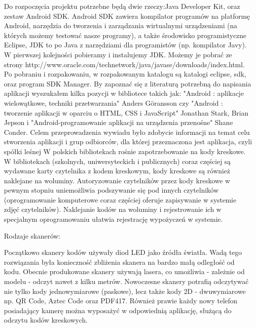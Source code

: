 



Do rozpoczęcia projektu potrzebne będą dwie rzeczy:Java Developer Kit, oraz zestaw Android SDK.  Android SDK zawiera kompilator programów na platformę Android, narzędzia do tworzenia i zarządzania wirtualnymi urządzeniami (na których możemy testować nasze programy), a także środowisko programistyczne Eclipse, JDK to po  Java z narzędziami dla programistów (np. kompilator Javy). W pierwszej kolejności pobieramy i instalujemy JDK. Możemy je pobrać ze strony http://www.oracle.com/technetwork/java/javase/downloads/index.html. Po pobraniu i rozpakowaniu, w rozpakowanym katalogu są katalogi eclipse, sdk, oraz program SDK Manager. 
By zapoznać się z literaturą potrzebną do napisania aplikacji wyszukałem kilka pozycji w bibliotece takich jak:  "Android : aplikacje wielowątkowe, techniki przetwarzania"  Anders Göransson czy "Android : tworzenie aplikacji w oparciu o HTML, CSS i JavaScript"  Jonathan Stark, Brian Jepson i "Android-programowanie aplikacji na urządzenia przenośne" Shane Conder.
Celem przeprowadzenia wywiadu było zdobycie informacji na temat celu stworzenia aplikacji i grup odbiorców, dla której przeznaczona jest aplikacja, czyli spółki leśnej
W polskich bibliotekach rośnie zapotrzebowanie na kody kreskowe. W bibliotekach (szkolnych, uniwersyteckich i publicznych) coraz częściej są wydawane karty czytelnika z kodem kreskowym, kody kreskowe są również naklejane na woluminy. Autoryzowanie czytelników przez kody kreskowe w pewnym stopniu uniemożliwia podszywanie się pod innych czytelników (oprogramowanie komputerowe coraz częściej oferuje zapisywanie w systemie zdjęć czytelników). Naklejanie kodów na woluminy i rejestrowanie ich w specjalnym oprogramowaniu ułatwia rejestrację wypożyczeń w systemie.

Rodzaje skanerów:

Początkowo skanery kodów używały diod LED jako źródła światła. Wadą tego rozwiązania była konieczność zbliżenia skanera na bardzo małą odległość od kodu. Obecnie produkowane skanery używają lasera, co umożliwia - zależnie od modelu - odczyt nawet z kilku metrów. Nowoczesne skanery potrafią odczytywać nie tylko kody jednowymiarowe (paskowe), lecz także kody 2D - dwuwymiarowe np. QR Code, Aztec Code oraz PDF417. Również prawie każdy nowy telefon posiadający kamerę można wyposażyć w odpowiednią aplikację, służącą do odczytu kodów kreskowych.

